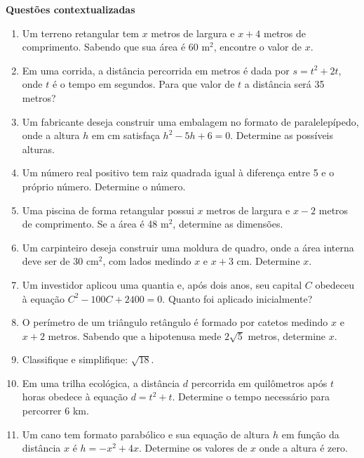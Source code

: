 \documentclass[12pt,a4paper]{article}
\begin{document}
\newpage

\textbf{Questões contextualizadas}

\begin{enumerate}

\item Um terreno retangular tem \(x\) metros de largura e \(x+4\) metros de comprimento. Sabendo que sua \'{a}rea \'e 60 m$^2$, encontre o valor de \(x\).

\item Em uma corrida, a dist\^{a}ncia percorrida em metros \'e dada por \(s = t^2 + 2t\), onde \(t\) \'e o tempo em segundos. Para que valor de \(t\) a dist\^{a}ncia ser\'a 35 metros?

\item Um fabricante deseja construir uma embalagem no formato de paralelep\'ipedo, onde a altura \(h\) em cm satisfa\c{c}a \(h^2 - 5h + 6 = 0\). Determine as poss\'iveis alturas.

\item Um n\'umero real positivo tem raiz quadrada igual \`a diferen\c{c}a entre 5 e o pr\'oprio n\'umero. Determine o n\'umero.

\item Uma piscina de forma retangular possui \(x\) metros de largura e \(x-2\) metros de comprimento. Se a \'{a}rea \'e 48 m$^2$, determine as dimens\~oes.

\item Um carpinteiro deseja construir uma moldura de quadro, onde a \'{a}rea interna deve ser de 30 cm$^2$, com lados medindo \(x\) e \(x+3\) cm. Determine \(x\).

\item Um investidor aplicou uma quantia e, ap\'os dois anos, seu capital \(C\) obedeceu \`a equa\c{c}\~ao \(C^2 - 100C + 2400 = 0\). Quanto foi aplicado inicialmente?

\item O per\'imetro de um tri\^angulo ret\^angulo \'e formado por catetos medindo \(x\) e \(x+2\) metros. Sabendo que a hipotenusa mede \(2\sqrt{5}\) metros, determine \(x\).

\item Classifique e simplifique: \(\sqrt{18}\).

\item Em uma trilha ecol\'ogica, a dist\^{a}ncia \(d\) percorrida em quil\^ometros ap\'os \(t\) horas obedece \`a equa\c{c}\~ao \(d = t^2 + t\). Determine o tempo necess\'ario para percorrer 6 km.

\item Um cano tem formato parab\'olico e sua equa\c{c}\~ao de altura \(h\) em fun\c{c}\~ao da dist\^{a}ncia \(x\) \'e \(h = -x^2 + 4x\). Determine os valores de \(x\) onde a altura \'e zero.


\end{enumerate}
\end{document}
